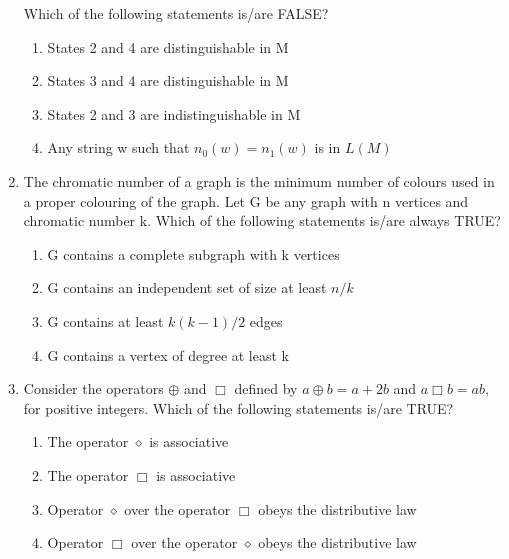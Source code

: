 \documentclass[a4paper, 11pt]{article}
\begin{document}
\begin{enumerate}
    Which of the following statements is/are FALSE?
    
    \begin{enumerate}
        \item States 2 and 4 are distinguishable in M
        \item States 3 and 4 are distinguishable in M
        \item States 2 and 3 are indistinguishable in M
        \item Any string w such that $n_0(w) = n_1(w)$ is in $L(M)$
    \end{enumerate}
    \hfill{}

    \item The chromatic number of a graph is the minimum number of colours used in a proper colouring of the graph. Let G be any graph with n vertices and chromatic number k. Which of the following statements is/are always TRUE?
    \begin{enumerate}
        \item G contains a complete subgraph with k vertices
        \item G contains an independent set of size at least $n/k$
        \item G contains at least $k(k-1)/2$ edges
        \item G contains a vertex of degree at least k
    \end{enumerate}
    \hfill{}

    \item Consider the operators $\oplus$ and $\Box$ defined by $a \oplus b = a+2b$ and $a \Box b = ab$, for positive integers. Which of the following statements is/are TRUE?
    \begin{enumerate}
        \item The operator $\diamond$ is associative
        \item The operator $\Box$ is associative
        \item Operator $\diamond$ over the operator $\Box$ obeys the distributive law
        \item Operator $\Box$ over the operator $\diamond$ obeys the distributive law
    \end{enumerate}
    \hfill{}


\end{enumerate}
\end{document}
